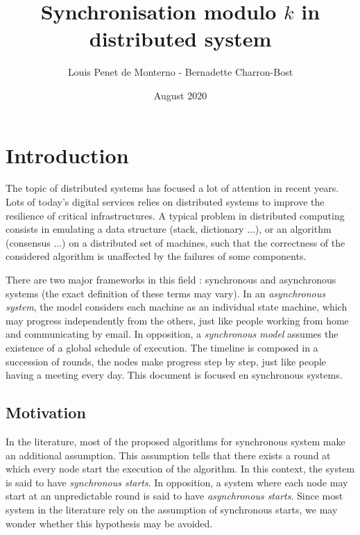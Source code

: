 \documentclass{article}
\title{Synchronisation modulo $k$ in distributed system}
\date{August 2020}
\author{Louis Penet de Monterno - Bernadette Charron-Bost}
\begin{document}
\maketitle

\section{Introduction}

The topic of distributed systems has focused a lot of attention in recent years.
Lots of today's digital services relies on distributed systems to improve the resilience of critical infrastructures.
A typical problem in distributed computing consists in emulating a data structure (stack, dictionary ...), or an algorithm (consensus ...) on a distributed
set of machines, such that the correctness of the considered algorithm is unaffected by the failures of some components.

There are two major frameworks in this field : synchronous and asynchronous systems (the exact definition of these terms may vary).
In an \emph{asynchronous system}, the model considers each machine as an individual state machine, which may progress independently from the others,
just like people working from home and communicating by email.
In opposition, a \emph{synchronous model} assumes the existence of a global schedule of execution.
The timeline is composed in a succession of rounds, the nodes make progress step by step,
just like people having a meeting every day.
This document is focused en synchronous systems.


\subsection{Motivation}

In the literature, most of the proposed algorithms for synchronous system make an additional assumption.
This assumption tells that there exists a round at which every node start the execution of the algorithm.
In this context, the system is said to have \emph{synchronous starts}.
In opposition, a system where each node may start at an unpredictable round is said to have \emph{asynchronous starts}.
Since most system in the literature rely on the assumption of synchronous starts, we may wonder whether this hypothesis may be avoided.
\end{document}
